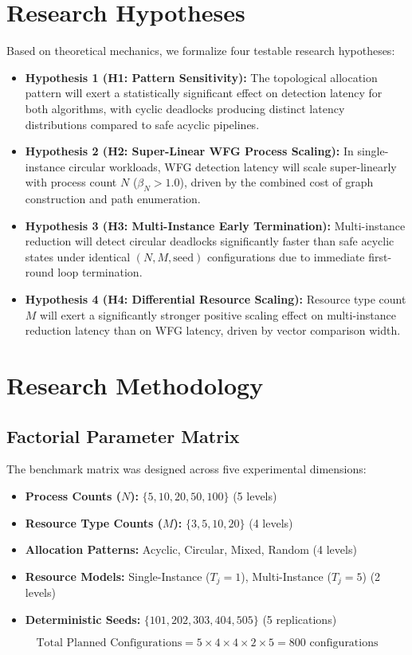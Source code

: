 \documentclass[11pt,a4paper]{article}
\begin{document}
\section{Research Hypotheses}
Based on theoretical mechanics, we formalize four testable research hypotheses:
\begin{itemize}
    \item \textbf{Hypothesis 1 (H1: Pattern Sensitivity):} The topological allocation pattern will exert a statistically significant effect on detection latency for both algorithms, with cyclic deadlocks producing distinct latency distributions compared to safe acyclic pipelines.
    \item \textbf{Hypothesis 2 (H2: Super-Linear WFG Process Scaling):} In single-instance circular workloads, WFG detection latency will scale super-linearly with process count $N$ ($\beta_N > 1.0$), driven by the combined cost of graph construction and path enumeration.
    \item \textbf{Hypothesis 3 (H3: Multi-Instance Early Termination):} Multi-instance reduction will detect circular deadlocks significantly faster than safe acyclic states under identical $(N, M, \text{seed})$ configurations due to immediate first-round loop termination.
    \item \textbf{Hypothesis 4 (H4: Differential Resource Scaling):} Resource type count $M$ will exert a significantly stronger positive scaling effect on multi-instance reduction latency than on WFG latency, driven by vector comparison width.
\end{itemize}

\section{Research Methodology}

\subsection{Factorial Parameter Matrix}
The benchmark matrix was designed across five experimental dimensions:
\begin{itemize}
    \item \textbf{Process Counts ($N$):} $\{5, 10, 20, 50, 100\}$ (5 levels)
    \item \textbf{Resource Type Counts ($M$):} $\{3, 5, 10, 20\}$ (4 levels)
    \item \textbf{Allocation Patterns:} Acyclic, Circular, Mixed, Random (4 levels)
    \item \textbf{Resource Models:} Single-Instance ($T_j = 1$), Multi-Instance ($T_j = 5$) (2 levels)
    \item \textbf{Deterministic Seeds:} $\{101, 202, 303, 404, 505\}$ (5 replications)
\end{itemize}
$$\text{Total Planned Configurations} = 5 \times 4 \times 4 \times 2 \times 5 = 800\text{ configurations}$$
\end{document}
